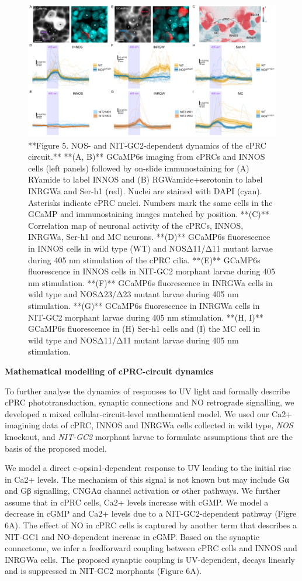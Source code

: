 \documentclass[
  10pt,
  onecolumn]{article}
\begin{document}
\begin{figure}
\includegraphics[width=52.08in]{figures/Fig5} \caption{**Figure 5. NOS- and NIT-GC2-dependent dynamics of the cPRC circuit.** **(A, B)** GCaMP6s imaging from cPRCs and INNOS cells (left panels) followed by on-slide immunostaining for (A) RYamide to label INNOS and (B) RGWamide+serotonin to label INRGWa and Ser-h1 (red). Nuclei are stained with DAPI (cyan). Asterisks indicate cPRC nuclei. Numbers mark the same cells in the GCaMP and immunostaining images matched by position. **(C)** Correlation map of neuronal activity of the cPRCs, INNOS, INRGWa, Ser-h1 and MC neurons. **(D)** GCaMP6s fluorescence in INNOS cells in wild type (WT) and NOSΔ11/Δ11 mutant larvae during 405 nm stimulation of the cPRC cilia. **(E)** GCaMP6s fluorescence in INNOS cells in NIT-GC2 morphant larvae during 405 nm stimulation. **(F)** GCaMP6s fluorescence in INRGWa cells in wild type and NOSΔ23/Δ23 mutant larvae during 405 nm stimulation. **(G)** GCaMP6s fluorescence in INRGWa cells in NIT-GC2 morphant larvae during 405 nm stimulation. **(H, I)** GCaMP6s fluorescence in (H) Ser-h1 cells and (I) the MC cell in wild type and NOSΔ11/Δ11 mutant larvae during 405 nm stimulation.}\label{fig:unnamed-chunk-5}
\end{figure}

\textbf{Mathematical modelling of cPRC-circuit dynamics}

To further analyse the dynamics of responses to UV light and formally
describe cPRC phototransduction, synaptic connections and NO retrograde
signalling, we developed a mixed cellular-circuit-level mathematical
model. We used our Ca2+ imagining data of cPRC, INNOS and INRGWa cells
collected in wild type, \emph{NOS} knockout, and \emph{NIT-GC2} morphant
larvae to formulate assumptions that are the basis of the proposed
model.

We model a direct c-opsin1-dependent response to UV leading to the
initial rise in Ca2+ levels. The mechanism of this signal is not known
but may include Gα and Gβ signalling, CNGAα channel activation or other
pathways. We further assume that in cPRC cells, Ca2+ levels increase
with cGMP. We model a decrease in cGMP and Ca2+ levels due to a
NIT-GC2-dependent pathway (Figre 6A). The effect of NO in cPRC cells is
captured by another term that describes a NIT-GC1 and NO-dependent
increase in cGMP. Based on the synaptic connectome, we infer a
feedforward coupling between cPRC cells and INNOS and INRGWa cells. The
proposed synaptic coupling is UV-dependent, decays linearly and is
suppressed in NIT-GC2 morphants (Figure 6A).
\end{document}
